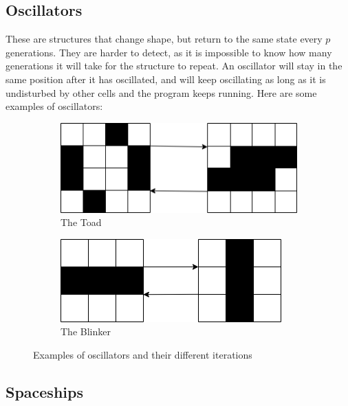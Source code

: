 \documentclass{l4proj}
\begin{document}
\subsection{Oscillators}

These are structures that change shape, but return to the same state every $p$ generations. They are  harder to detect, as it is impossible to know how many generations it will take for the structure to repeat. An oscillator will stay in the same position after it has oscillated, and will keep oscillating as long as it is undisturbed by other cells and the program keeps running. Here are some examples of oscillators:

\begin{figure}[h]
\centering
\begin{subfigure}[b]{0.4\textwidth}
    \includegraphics[width=\textwidth]{dissertation/images/gol_structures/toad_transition.png} 
    \caption{The Toad}
    \label{fig:subim1}
\end{subfigure}
\hfill
\begin{subfigure}[b]{0.4\textwidth}
    \includegraphics[width=\textwidth]{dissertation/images/gol_structures/blinker_transition.png} 
    \caption{The Blinker}
    \label{fig:subim1}
\end{subfigure}

\caption{Examples of oscillators and their different iterations}
\end{figure}

\subsection{Spaceships}
\end{document}

